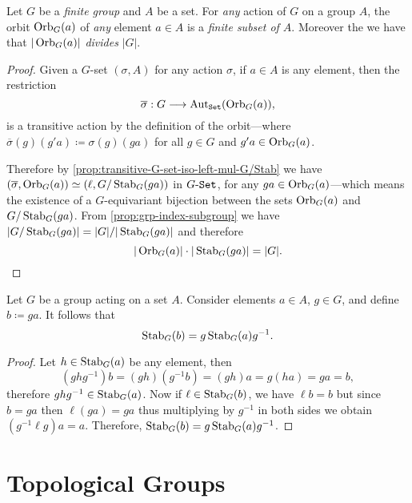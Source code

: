 \begin{corollary}
    \label{cor:orbit-divides-order-of-group}
    Let \(G\) be a \emph{finite group} and \(A\) be a set. For \emph{any} action of
    \(G\) on a group \(A\), the orbit \(\operatorname{Orb}_G(a)\) of \emph{any} element
    \(a \in A\) is a \emph{finite subset of \(A\)}. Moreover the we have that
    \(|\operatorname{Orb}_G(a)|\) \emph{divides} \(|G|\).
\end{corollary}

\begin{proof}
    Given a \(G\)-set \((\sigma, A)\) for any action \(\sigma\), if \(a \in A\) is
    any element, then the restriction
    \[
        \overline{\sigma}: G \longrightarrow \operatorname{Aut}_{{\texttt{Set}}}(\operatorname{Orb}_G(a)),
    \]
    is a transitive action by the definition of the orbit---where
    \(\overline{\sigma}(g)(g' a) \coloneq \sigma(g)(g a)\) for all \(g \in G\) and
    \(g' a \in \operatorname{Orb}_G(a)\).

    Therefore by \cref{prop:transitive-G-set-iso-left-mul-G/Stab} we have
    \((\overline{\sigma}, \operatorname{Orb}_G(a)) \simeq (\ell, G/\operatorname{Stab}_G(g a))\) in
    \({{G}\text{-}{\texttt{Set}}}\), for any \(g a \in \operatorname{Orb}_G(a)\)---which means the existence of a
    \(G\)-equivariant bijection between the sets \(\operatorname{Orb}_G(a)\) and
    \(G/\operatorname{Stab}_G(g a)\). From \cref{prop:grp-index-subgroup} we have
    \(|G/\operatorname{Stab}_G(g a)| = |G|/|\operatorname{Stab}_G(g a)|\) and therefore
    \[
        |\operatorname{Orb}_G(a)| \cdot |\operatorname{Stab}_G(g a)| = |G|.
    \]
\end{proof}

\begin{theorem}
    \label{thm:stabilizers-conjugation}
    Let \(G\) be a group acting on a set \(A\). Consider elements \(a \in A\),
    \(g \in G\), and define \(b \coloneq g a\). It follows that
    \[
        \operatorname{Stab}_G(b) = g \operatorname{Stab}_G(a) g^{-1}.
    \]
\end{theorem}

\begin{proof}
    Let \(h \in \operatorname{Stab}_G(a)\) be any element, then
    \[
        (g h g^{-1}) b = (g h) (g^{-1} b) = (g h) a = g (h a) = g a = b,
    \]
    therefore \(g h g^{-1} \in \operatorname{Stab}_G(a)\). Now if \(\ell \in \operatorname{Stab}_G(b)\), we have
    \(\ell b = b\) but since \(b = g a\) then \(\ell (g a) = g a\) thus multiplying
    by \(g^{-1}\) in both sides we obtain \((g^{-1} \ell g) a = a\). Therefore,
    \(\operatorname{Stab}_G(b) = g \operatorname{Stab}_G(a) g^{-1}\).
\end{proof}

\section{Topological Groups}

